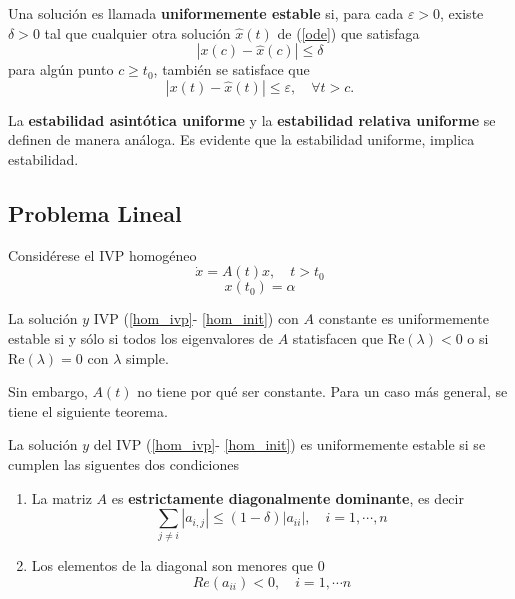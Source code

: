\begin{definition}
    Una solución es llamada \textbf{uniformemente estable} si, para cada $\varepsilon > 0$, existe $\delta > 0$ tal que cualquier otra solución $\hat x(t)$ de (\ref{ode}) que satisfaga
    \begin{equation}
        |x(c) - \hat x(c)| \leq \delta
    \end{equation}
    para algún punto $c \geq t_0$, también se satisface que
    \begin{equation}
        |x(t) - \hat x(t)| \leq \varepsilon, \quad \forall t > c.
    \end{equation}
\end{definition}

La \textbf{estabilidad asintótica uniforme} y la \textbf{estabilidad relativa uniforme} se definen de manera análoga. Es evidente que la estabilidad uniforme, implica estabilidad.

\subsection{Problema Lineal}
Considérese el IVP homogéneo 
    \begin{equation}
        \label{hom_ivp}
        \dot x = A(t)x, \quad  t > t_0
    \end{equation}
    \begin{equation}
        \label{hom_init}
        x(t_0) = \alpha
    \end{equation}


\begin{theorem}
    La solución $y$ IVP (\ref{hom_ivp}- \ref{hom_init}) con $A$ constante es uniformemente estable si y sólo si todos los eigenvalores de $A$ statisfacen que $\text{Re}(\lambda) < 0$ o si $\text{Re}(\lambda) = 0$ con $\lambda$ simple. 
\end{theorem}

Sin embargo, $A(t)$ no tiene por qué ser constante. Para un caso más general, se tiene el siguiente teorema.
\begin{theorem}
    \label{lineal_ivp}
    La solución $y$ del IVP (\ref{hom_ivp}- \ref{hom_init}) es uniformemente estable si se cumplen las siguentes dos condiciones
    \begin{enumerate}
        \item La matriz $A$ es \textbf{estrictamente diagonalmente dominante}, es decir 
        \begin{equation}
            \sum_{j\neq i} |a_{i,j}| \leq (1-\delta)|a_{ii}|, \quad i = 1, \cdots, n
        \end{equation}
        \item Los elementos de la diagonal son menores que 0 
        \begin{equation}
            Re(a_{ii}) < 0, \quad i = 1, \cdots n
        \end{equation}
    \end{enumerate}
\end{theorem}

